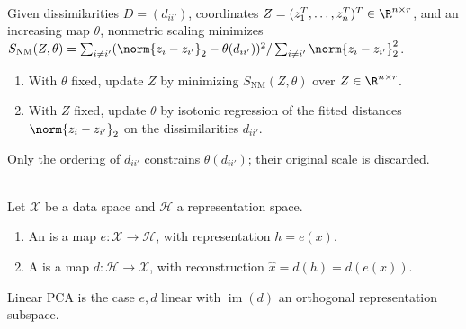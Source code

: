 \begin{method} \label{meth:sl-nonmetric-multidimensional-scaling} \\
Given dissimilarities $D=(d_{ii'})$, coordinates $Z=(z_1^T,\ldots,z_n^T)^T\in\R^{n\times r}$, and an increasing map $\theta$, nonmetric scaling minimizes $S_{\mathrm{NM}}(Z,\theta)=\sum_{i\neq i'}(\norm{z_i-z_{i'}}_2-\theta(d_{ii'}))^2/\sum_{i\neq i'}\norm{z_i-z_{i'}}_2^2$.
\begin{enumerate}[label=(\roman*)]
\setlength{\itemsep}{0pt}
\item With $\theta$ fixed, update $Z$ by minimizing $S_{\mathrm{NM}}(Z,\theta)$ over $Z\in\R^{n\times r}$.
\item With $Z$ fixed, update $\theta$ by isotonic regression of the fitted distances $\norm{z_i-z_{i'}}_2$ on the dissimilarities $d_{ii'}$.
\end{enumerate}
Only the ordering of $d_{ii'}$ constrains $\theta(d_{ii'})$; their original scale is discarded.
\end{method}

\begin{definition} \label{def:sl-encoder-decoder} \\
Let $\mathcal{X}$ be a data space and $\mathcal{H}$ a representation space.
\begin{enumerate}[label=(\roman*)]
\setlength{\itemsep}{0pt}
\item An  is a map $e:\mathcal{X}\to\mathcal{H}$, with representation $h=e(x)$.
\item A  is a map $d:\mathcal{H}\to\mathcal{X}$, with reconstruction $\widehat{x}=d(h)=d(e(x))$.
\end{enumerate}
Linear PCA is the case $e,d$ linear with $\operatorname{im}(d)$ an orthogonal representation subspace.
\end{definition}

